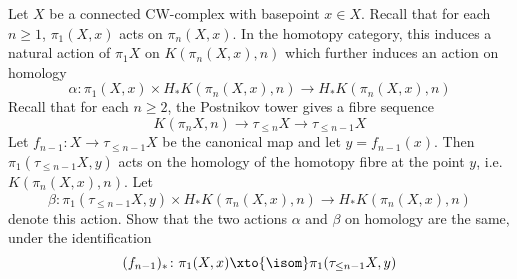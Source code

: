 \begin{exercise}\label{ex:postnikovaction}
	Let $X$ be a connected CW-complex with basepoint $x \in X$.
	Recall that for each $n \geq 1$, $\pi_1(X, x)$ acts on $\pi_n(X, x)$.
	In the homotopy category, this induces a natural action of $\pi_1 X$ on $K(\pi_n(X, x), n)$ which further induces an action on homology
	\begin{equation*}
		\alpha\colon \pi_1(X, x) \times H_* K(\pi_n(X, x), n) \to H_* K(\pi_n(X, x), n)
	\end{equation*}
	Recall that for each $n \geq 2$, the Postnikov tower gives a fibre sequence
	\begin{equation*}
		K(\pi_n X, n) \to \tau_{\leq n} X \to \tau_{\leq n - 1} X
	\end{equation*}
	Let $f_{n - 1}\colon X \to \tau_{\leq n - 1} X$ be the canonical map and let $y = f_{n - 1}(x)$.
	Then $\pi_1(\tau_{\leq n - 1} X, y)$ acts on the homology of the homotopy fibre at the point $y$, i.e. $K(\pi_n(X, x), n)$.
	Let
	\begin{equation*}
		\beta\colon \pi_1(\tau_{\leq n - 1} X, y) \times H_* K(\pi_n(X, x), n) \to H_* K(\pi_n(X, x), n)
	\end{equation*}
	denote this action.
	Show that the two actions $\alpha$ and $\beta$ on homology are the same, under the identification
	\begin{equation*}
		(f_{n - 1})_*\colon \pi_1(X, x) \xto{\isom} \pi_1(\tau_{\leq n - 1} X, y)
	\end{equation*}
\end{exercise}

